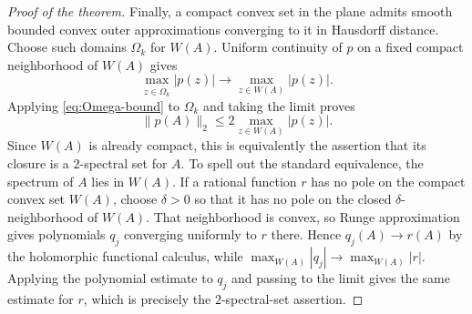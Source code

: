 \documentclass[11pt]{article}
\begin{document}
\begin{proof}[Proof of the theorem]
Finally, a compact convex set in the plane admits smooth bounded convex
outer approximations converging to it in Hausdorff distance.  Choose such
domains \(\Omega_k\) for \(W(A)\).  Uniform continuity of \(p\) on a fixed
compact neighborhood of \(W(A)\) gives
\[
 \max_{z\in\overline\Omega_k}|p(z)|
 \longrightarrow
 \max_{z\in W(A)}|p(z)|.
\]
Applying \eqref{eq:Omega-bound} to \(\Omega_k\) and taking the limit proves
\[
 \|p(A)\|_2\leq2\max_{z\in W(A)}|p(z)|.
\]
Since \(W(A)\) is already compact, this is equivalently the assertion
that its closure is a \(2\)-spectral set for \(A\).  To spell out the
standard equivalence, the spectrum of \(A\) lies in \(W(A)\).  If a
rational function \(r\) has no pole on the compact convex set \(W(A)\),
choose \(\delta>0\) so that it has no pole on the closed
\(\delta\)-neighborhood of \(W(A)\).  That neighborhood is convex, so
Runge approximation gives polynomials \(q_j\) converging uniformly to
\(r\) there.  Hence \(q_j(A)\to r(A)\) by the holomorphic functional
calculus, while
\(\max_{W(A)}|q_j|\to\max_{W(A)}|r|\).  Applying the polynomial estimate
to \(q_j\) and passing to the limit gives the same estimate for \(r\),
which is precisely the \(2\)-spectral-set assertion.
\end{proof}
\end{document}

